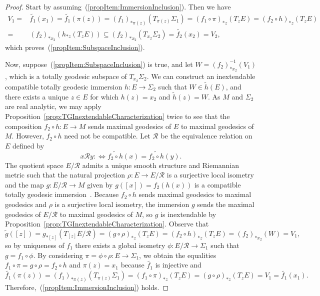 \documentclass[11pt,a4paper,final]{amsart}
\renewcommand{\tilde}{\widetilde}
\theoremstyle{definition}
\begin{document}
\begin{proof}
	Start by assuming~(\ref{propItem:ImmersionInclusion}).
	Then we have
	\[
		\begin{aligned}
			V_{1}={}&\tilde{f_{1}}(x_{1})=\tilde{f_{1}}(\pi(z))=(f_{1})_{*\pi(z)}(T_{\pi(z)}\Sigma_{1})=(f_{1}\circ\pi)_{*z}(T_{z}E)=(f_{2}\circ h)_{*z}(T_{z}E) \\
			={}&(f_{2})_{*x_{2}}(h_{*z}(T_{z}E))\subseteq (f_{2})_{*x_{2}}(T_{x_{2}}\Sigma_{2})=\tilde{f_{2}}(x_{2})=V_{2},
		\end{aligned}
	\]
	which proves~(\ref{propItem:SubspaceInclusion}).
	
	Now, suppose~(\ref{propItem:SubspaceInclusion}) is true, and let $W=(f_{2})_{*x_{2}}^{-1}(V_{1})$, which is a totally geodesic subspace of $T_{x_{2}}\Sigma_{2}$.
	We can construct an inextendable compatible totally geodesic immersion $h\colon E \to \Sigma_{2}$ such that $W\in\tilde{h}(E)$, and there exists a unique $z\in E$ for which $h(z)=x_{2}$ and $\tilde{h}(z)=W$.
	As $M$ and $\Sigma_{2}$ are real analytic, we may apply Proposition~\ref{prop:TGInextendableCharacterization} twice to see that the composition $f_{2}\circ h\colon E\to M$ sends maximal geodesics of $E$ to maximal geodesics of $M$. 
	However, $f_{2}\circ h$ need not be compatible.
	Let $\mathcal{R}$ be the equivalence relation on $E$ defined by \[x\mathcal{R}y:\Leftrightarrow\tilde{f_{2}\circ h}(x)=\tilde{f_{2}\circ h}(y).\]
	The quotient space $E/\mathcal{R}$ admits a unique smooth structure and Riemannian metric such that the natural projection $\rho\colon E\to E/\mathcal{R}$ is a surjective local isometry and the map $g\colon E/\mathcal{R}\to M$ given by $g([x])=f_{2}(h(x))$ is a compatible totally geodesic immersion~\cite[Section~10.3.1]{BerndtConsoleOlmos}.
	Because $f_{2}\circ h$ sends maximal geodesics to maximal geodesics and $\rho$ is a surjective local isometry, the immersion $g$ sends the maximal geodesics of $E/\mathcal{R}$ to maximal geodesics of $M$, so $g$ is inextendable by Proposition~\ref{prop:TGInextendableCharacterization}.
	Observe that
	\[
		\tilde{g}([z])=g_{*[z]}(T_{[z]}E/\mathcal{R})=(g\circ \rho)_{*z}(T_{z}E)=(f_{2}\circ h)_{*z}(T_{z}E)=(f_{2})_{*x_{2}}(W)=V_{1},
	\]
	so by uniqueness of $f_{1}$ there exists a global isometry $\phi\colon E/\mathcal{R}\to \Sigma_{1}$ such that $g=f_{1}\circ\phi$.
	By considering $\pi=\phi\circ \rho\colon E\to \Sigma_{1}$, we obtain the equalities $f_{1}\circ \pi=g\circ\rho=f_{2}\circ h$ and $\pi(z)=x_{1}$ because $\tilde{f_{1}}$ is injective and
	\[
		\tilde{f_{1}}(\pi(z))=(f_{1})_{*\pi(z)}(T_{\pi(z)}\Sigma_{1})=(f_{1}\circ\pi)_{*z}(T_{z}E)=(g\circ\rho)_{*z}(T_{z}E)=V_{1}=\tilde{f_{1}}(x_{1}).
	\]
	Therefore,~(\ref{propItem:ImmersionInclusion}) holds.
	

\end{proof}
\end{document}
